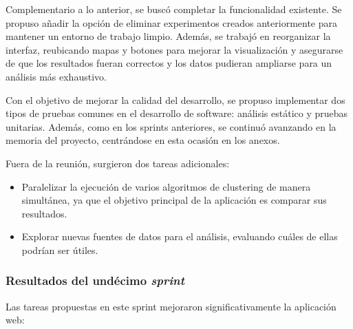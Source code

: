 Complementario a lo anterior, se buscó completar la funcionalidad existente. Se propuso añadir la opción de eliminar experimentos creados anteriormente para mantener un entorno de trabajo limpio. Además, se trabajó en reorganizar la interfaz, reubicando mapas y botones para mejorar la visualización y asegurarse de que los resultados fueran correctos y los datos pudieran ampliarse para un análisis más exhaustivo.

Con el objetivo de mejorar la calidad del desarrollo, se propuso implementar dos tipos de pruebas comunes en el desarrollo de software: análisis estático y pruebas unitarias. Además, como en los sprints anteriores, se continuó avanzando en la memoria del proyecto, centrándose en esta ocasión en los anexos.

Fuera de la reunión, surgieron dos tareas adicionales:

\begin{itemize}
    \item Paralelizar la ejecución de varios algoritmos de clustering de manera simultánea, ya que el objetivo principal de la aplicación es comparar sus resultados.
    \item Explorar nuevas fuentes de datos para el análisis, evaluando cuáles de ellas podrían ser útiles.
\end{itemize}

\subsubsection{Resultados del undécimo \textit{sprint}}

Las tareas propuestas en este sprint mejoraron significativamente la aplicación web:

